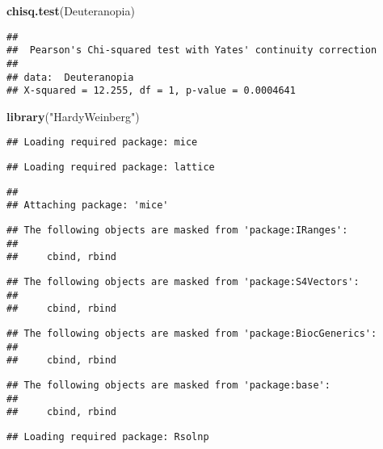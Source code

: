 \documentclass[]{article}
\newenvironment{Shaded}{\begin{snugshade}}{\end{snugshade}}
\newcommand{\KeywordTok}[1]{\textcolor[rgb]{0.13,0.29,0.53}{\textbf{#1}}}
\newcommand{\StringTok}[1]{\textcolor[rgb]{0.31,0.60,0.02}{#1}}
\newcommand{\NormalTok}[1]{#1}
\begin{document}
\begin{Shaded}
\begin{Highlighting}[]
\KeywordTok{chisq.test}\NormalTok{(Deuteranopia)}
\end{Highlighting}
\end{Shaded}

\begin{verbatim}
## 
##  Pearson's Chi-squared test with Yates' continuity correction
## 
## data:  Deuteranopia
## X-squared = 12.255, df = 1, p-value = 0.0004641
\end{verbatim}

\begin{Shaded}
\begin{Highlighting}[]
\KeywordTok{library}\NormalTok{(}\StringTok{"HardyWeinberg"}\NormalTok{)}
\end{Highlighting}
\end{Shaded}

\begin{verbatim}
## Loading required package: mice
\end{verbatim}

\begin{verbatim}
## Loading required package: lattice
\end{verbatim}

\begin{verbatim}
## 
## Attaching package: 'mice'
\end{verbatim}

\begin{verbatim}
## The following objects are masked from 'package:IRanges':
## 
##     cbind, rbind
\end{verbatim}

\begin{verbatim}
## The following objects are masked from 'package:S4Vectors':
## 
##     cbind, rbind
\end{verbatim}

\begin{verbatim}
## The following objects are masked from 'package:BiocGenerics':
## 
##     cbind, rbind
\end{verbatim}

\begin{verbatim}
## The following objects are masked from 'package:base':
## 
##     cbind, rbind
\end{verbatim}

\begin{verbatim}
## Loading required package: Rsolnp
\end{verbatim}
\end{document}
